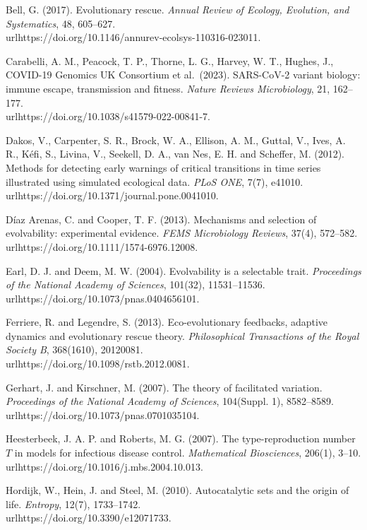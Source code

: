 \documentclass[11pt]{article}
\begin{document}
Bell, G. (2017). Evolutionary rescue. \emph{Annual Review of Ecology,
Evolution, and Systematics}, 48, 605--627.
\\url{https://doi.org/10.1146/annurev-ecolsys-110316-023011}.

Carabelli, A. M., Peacock, T. P., Thorne, L. G., Harvey, W. T., Hughes,
J., COVID-19 Genomics UK Consortium et al.~(2023). SARS-CoV-2 variant
biology: immune escape, transmission and fitness. \emph{Nature Reviews
Microbiology}, 21, 162--177. \\url{https://doi.org/10.1038/s41579-022-00841-7}.

Dakos, V., Carpenter, S. R., Brock, W. A., Ellison, A. M., Guttal, V.,
Ives, A. R., Kéfi, S., Livina, V., Seekell, D. A., van Nes, E. H. and
Scheffer, M. (2012). Methods for detecting early warnings of critical
transitions in time series illustrated using simulated ecological data.
\emph{PLoS ONE}, 7(7), e41010. \\url{https://doi.org/10.1371/journal.pone.0041010}.

Díaz Arenas, C. and Cooper, T. F. (2013). Mechanisms and selection of
evolvability: experimental evidence. \emph{FEMS Microbiology Reviews},
37(4), 572--582. \\url{https://doi.org/10.1111/1574-6976.12008}.

Earl, D. J. and Deem, M. W. (2004). Evolvability is a selectable trait.
\emph{Proceedings of the National Academy of Sciences}, 101(32),
11531--11536. \\url{https://doi.org/10.1073/pnas.0404656101}.

Ferriere, R. and Legendre, S. (2013). Eco-evolutionary feedbacks,
adaptive dynamics and evolutionary rescue theory. \emph{Philosophical
Transactions of the Royal Society B}, 368(1610), 20120081.
\\url{https://doi.org/10.1098/rstb.2012.0081}.

Gerhart, J. and Kirschner, M. (2007). The theory of facilitated
variation. \emph{Proceedings of the National Academy of Sciences},
104(Suppl. 1), 8582--8589. \\url{https://doi.org/10.1073/pnas.0701035104}.

Heesterbeek, J. A. P. and Roberts, M. G. (2007). The type-reproduction
number \(T\) in models for infectious disease control.
\emph{Mathematical Biosciences}, 206(1), 3--10.
\\url{https://doi.org/10.1016/j.mbs.2004.10.013}.

Hordijk, W., Hein, J. and Steel, M. (2010). Autocatalytic sets and the
origin of life. \emph{Entropy}, 12(7), 1733--1742.
\\url{https://doi.org/10.3390/e12071733}.
\end{document}
